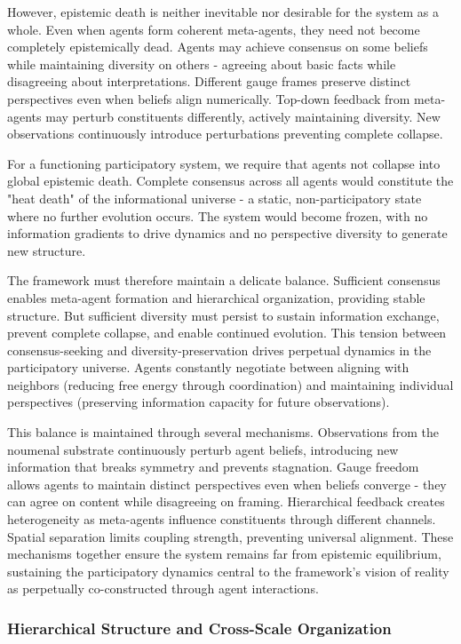 \documentclass[11pt]{article}
\begin{document}
However, epistemic death is neither inevitable nor desirable for the system as a whole. Even when agents form coherent meta-agents, they need not become completely epistemically dead. Agents may achieve consensus on some beliefs while maintaining diversity on others - agreeing about basic facts while disagreeing about interpretations. Different gauge frames preserve distinct perspectives even when beliefs align numerically. Top-down feedback from meta-agents may perturb constituents differently, actively maintaining diversity. New observations continuously introduce perturbations preventing complete collapse.

For a functioning participatory system, we require that agents not collapse into global epistemic death. Complete consensus across all agents would constitute the "heat death" of the informational universe - a static, non-participatory state where no further evolution occurs. The system would become frozen, with no information gradients to drive dynamics and no perspective diversity to generate new structure.

The framework must therefore maintain a delicate balance. Sufficient consensus enables meta-agent formation and hierarchical organization, providing stable structure. But sufficient diversity must persist to sustain information exchange, prevent complete collapse, and enable continued evolution. This tension between consensus-seeking and diversity-preservation drives perpetual dynamics in the participatory universe. Agents constantly negotiate between aligning with neighbors (reducing free energy through coordination) and maintaining individual perspectives (preserving information capacity for future observations).

This balance is maintained through several mechanisms. Observations from the noumenal substrate continuously perturb agent beliefs, introducing new information that breaks symmetry and prevents stagnation. Gauge freedom allows agents to maintain distinct perspectives even when beliefs converge - they can agree on content while disagreeing on framing. Hierarchical feedback creates heterogeneity as meta-agents influence constituents through different channels. Spatial separation limits coupling strength, preventing universal alignment. These mechanisms together ensure the system remains far from epistemic equilibrium, sustaining the participatory dynamics central to the framework's vision of reality as perpetually co-constructed through agent interactions.


\subsubsection{Hierarchical Structure and Cross-Scale Organization}
\end{document}
